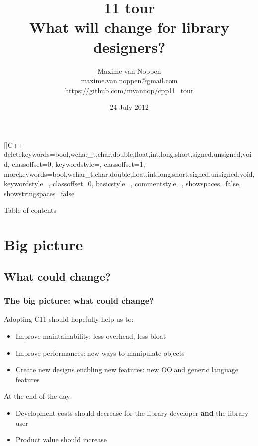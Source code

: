 \documentclass[xcolor=dvipsnames]{beamer}
\title[\CC{}11 tour\hspace{25mm} \insertframenumber/\inserttotalframenumber]{\CC{}11 tour\\What will change for library designers?}
\author[Maxime van Noppen]{Maxime van Noppen\\maxime.van.noppen@gmail.com\\\url{https://github.com/mvannop/cpp11_tour}}
\date{24 July 2012}
\newcommand{\CC}{C\nolinebreak\hspace{-.05em}\raisebox{.4ex}{\scriptsize\bf +}\nolinebreak\hspace{-.05em}\raisebox{.4ex}{\scriptsize\bf +}}
\begin{document}

[]{C++}%
  {
    deletekeywords={bool,wchar_t,char,double,float,int,long,short,signed,unsigned,void},
    classoffset=0,
    keywordstyle=\color{orange},
    classoffset=1,
    morekeywords={bool,wchar_t,char,double,float,int,long,short,signed,unsigned,void},
    keywordstyle=\color{blue},
    classoffset=0,
    basicstyle=\footnotesize\ttfamily,
    commentstyle=\color{red},
    showspaces=false,
    showstringspaces=false
  }%



\begin{frame}
\titlepage
\end{frame}

\begin{frame}{Table of contents}
\tableofcontents
\end{frame}

\section{Big picture}
\subsection{What could change?}
\begin{frame}
\frametitle{The big picture: what could change?}

Adopting \CC{}11 should hopefully help us to:

\begin{itemize}
  \item Improve maintainability: less overhead, less bloat
  \pause
  \item Improve performances: new ways to manipulate objects
  \pause
  \item Create new designs enabling new features: new OO and generic language features
\end{itemize}

\pause
At the end of the day:
\begin{itemize}
  \item Development costs should decrease for the library developer \textbf{and} the library user
  \pause
  \item Product value should increase
\end{itemize}
\end{frame}
\end{document}
